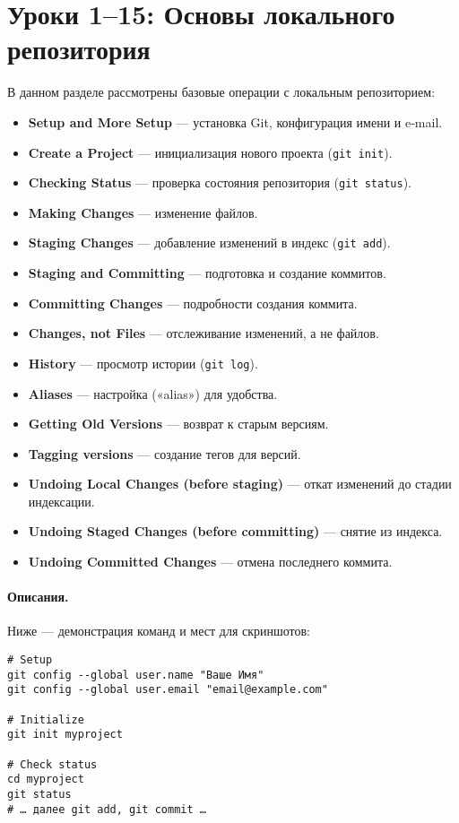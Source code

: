 \section{Уроки 1--15: Основы локального репозитория}\label{sec:1-15}
В данном разделе рассмотрены базовые операции с локальным репозиторием:

\begin{itemize}
    \item \textbf{Setup and More Setup} — установка Git, конфигурация имени и e‑mail.
    \item \textbf{Create a Project} — инициализация нового проекта (\texttt{git init}).
    \item \textbf{Checking Status} — проверка состояния репозитория (\texttt{git status}).
    \item \textbf{Making Changes} — изменение файлов.
    \item \textbf{Staging Changes} — добавление изменений в индекс (\texttt{git add}).
    \item \textbf{Staging and Committing} — подготовка и создание коммитов.
    \item \textbf{Committing Changes} — подробности создания коммита.
    \item \textbf{Changes, not Files} — отслеживание изменений, а не файлов.
    \item \textbf{History} — просмотр истории (\texttt{git log}).
    \item \textbf{Aliases} — настройка («alias») для удобства.
    \item \textbf{Getting Old Versions} — возврат к старым версиям.
    \item \textbf{Tagging versions} — создание тегов для версий.
    \item \textbf{Undoing Local Changes (before staging)} — откат изменений до стадии индексации.
    \item \textbf{Undoing Staged Changes (before committing)} — снятие из индекса.
    \item \textbf{Undoing Committed Changes} — отмена последнего коммита.
\end{itemize}

\paragraph{Описания.} Ниже — демонстрация команд и мест для скриншотов:

\begin{verbatim}
# Setup
git config --global user.name "Ваше Имя"
git config --global user.email "email@example.com"

# Initialize
git init myproject

# Check status
cd myproject
git status
# … далее git add, git commit …
\end{verbatim}

